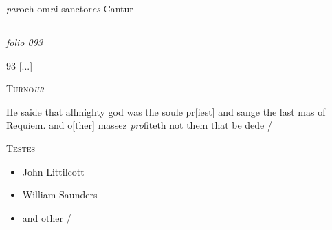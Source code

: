 \documentclass[12pt, a4paper]{book}
\begin{document}
		\ifthenelse{\isodd{\thepage}}
		{\reversemarginpar}
		{\normalmarginpar}
		\textit{par}och om\textit{n}i sanctor\textit{es} Cantur

            
            
\dotfill
						\newpage {} \subsection*{}  \subsection*{}  \subsection*{}  \subsection*{}

\textit{folio 093}


\begin{flushright}{\color{Mahogany}93} 
				[...]
			\end{flushright}
 

	
				\begin{center} \begin{large} {\scshape Turno\textit{ur}} \end{large} \end{center}
			
	
		
			
		
		\ifthenelse{\isodd{\thepage}}
		{\reversemarginpar}
		{\normalmarginpar}
		He saide that allmighty god was the soule pr[iest]
 and sange the last mas of Requiem. and o[ther]
		massez\textit{ pro}fiteth not them that be dede /
	

	\begin{center} {\scshape Testes} \end{center}\begin{itemize}
		
		\item[]John Littilcott
		\item[]William Saunders
		\item[]and other /
	\end{itemize}
	
\end{document}
